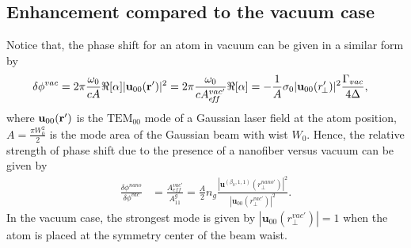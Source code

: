 \documentclass[preprint,aps,pra,onecolumn]{revtex4-1} %
\begin{document}
\subsection{Enhancement compared to the vacuum case}
Notice that, the phase shift for an atom in vacuum can be given in a similar form by
\begin{align}
\delta\phi^{vac} &= 2\pi \frac{\omega_0}{cA} \Re[\alpha] |\mathbf{u}_{00}(\mathbf{r}')|^2 =  2\pi \frac{\omega_0}{c A^{vac'}_{e\!f\!f}} \Re[\alpha]=-\frac{1}{A} \sigma_0 |\mathbf{u}_{00} (r'_{\!\perp})|^2 \frac{\Gamma_{vac}}{4\Delta},
\end{align}
where $\mathbf{u}_{00}(\mathbf{r}')  $ is the $\mathrm{TEM}_{00}$ mode of a Gaussian laser field at the atom position, $ A=\frac{\pi W_0^2}{2} $ is the mode area of the Gaussian beam with wist $ W_0 $. Hence, the relative strength of phase shift due to the presence of a nanofiber versus vacuum can be given by
\begin{align}
\frac{\delta\phi^{nano}}{\delta\phi^{vac}} &=\frac{A_{e\!f\!f}^{vac'}}{A^g_{11}}= \frac{A}{2} \!n_g\! \frac{|\mathbf{u}^{(\beta_0,1,1)}(r_\perp^{nano'})|^2}{|\mathbf{u}_{00}(r_\perp^{vac'})|^2}.
\end{align}
In the vacuum case, the strongest mode is given by $ |\mathbf{u}_{00}(r_\perp^{vac'})|=1 $ when the atom is placed at the symmetry center of the beam waist. 

\end{document}

